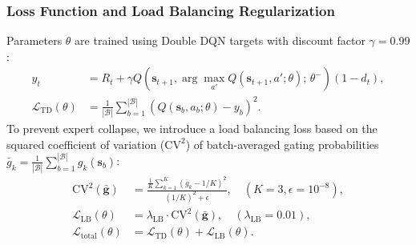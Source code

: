 \documentclass[journal]{IEEEtran}
\begin{document}
\subsubsection{Loss Function and Load Balancing Regularization}
Parameters $\theta$ are trained using Double DQN targets with discount factor $\gamma = 0.99$:
\begin{align}
\label{eq:ddqn_target}
y_t &= R_t + \gamma Q\left(\mathbf{s}_{t+1}, \arg\max_{a'} Q(\mathbf{s}_{t+1}, a'; \theta); \, \theta^-\right)(1 - d_t), \\
\label{eq:loss_td}
\mathcal{L}_{\text{TD}}(\theta) &= \frac{1}{|\mathcal{B}|}\sum_{b=1}^{|\mathcal{B}|} \left( Q(\mathbf{s}_b, a_b; \theta) - y_b \right)^2.
\end{align}
To prevent expert collapse, we introduce a load balancing loss based on the squared coefficient of variation ($\text{CV}^2$) of batch-averaged gating probabilities $\bar{g}_k = \frac{1}{|\mathcal{B}|}\sum_{b=1}^{|\mathcal{B}|} g_k(\mathbf{s}_b)$:
\begin{align}
\label{eq:cv_squared}
\text{CV}^2(\bar{\mathbf{g}}) &= \frac{\frac{1}{K}\sum_{k=1}^K (\bar{g}_k - 1/K)^2}{(1/K)^2 + \epsilon}, \quad (K=3, \epsilon=10^{-8}), \\
\label{eq:loss_lb}
\mathcal{L}_{\text{LB}}(\theta) &= \lambda_{\text{LB}} \cdot \text{CV}^2(\bar{\mathbf{g}}), \quad (\lambda_{\text{LB}} = 0.01), \\
\label{eq:loss_total}
\mathcal{L}_{\text{total}}(\theta) &= \mathcal{L}_{\text{TD}}(\theta) + \mathcal{L}_{\text{LB}}(\theta).
\end{align}
\end{document}
